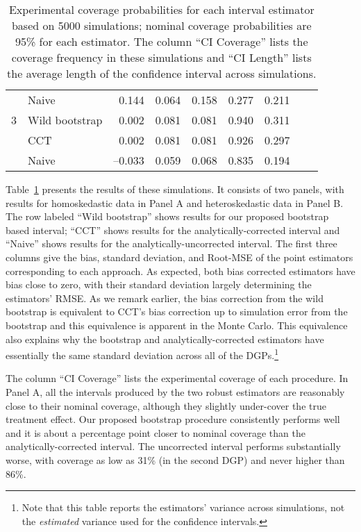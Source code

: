\documentclass[12pt,fleqn]{article}
\begin{document}
\begin{table}[t]
\begin{tabular}{rlrrrrrrr}
      & Naive          & 0.144 & 0.064 & 0.158 & 0.277 & 0.211 \\
    3 & Wild bootstrap & 0.002 & 0.081 & 0.081 & 0.940 & 0.311 \\
      & CCT            & 0.002 & 0.081 & 0.081 & 0.926 & 0.297 \\
      & Naive          & --0.033 & 0.059 & 0.068 & 0.835 & 0.194 \\
    \bottomrule
  \end{tabular}
  \caption{%
    Experimental coverage probabilities for each interval estimator based on 5000
    simulations; nominal coverage probabilities are 95\% for each estimator. The column
    ``CI Coverage'' lists the coverage frequency in these simulations and ``CI Length''
    lists the average length of the confidence interval across simulations.}
  \label{tbl:1}
\end{table}

Table~\ref{tbl:1} presents the results of these simulations. It consists of two panels, with results for homoskedastic data in Panel A and heteroskedastic data in Panel B. The row labeled
``Wild bootstrap'' shows results for our proposed bootstrap based interval; ``CCT'' shows
results for the analytically-corrected interval and ``Naive'' shows results for
the analytically-uncorrected interval. The first three columns give the bias,
standard deviation, and Root-MSE of the point
estimators corresponding to each approach.  As expected, both
bias corrected estimators have
bias close to zero, with their standard deviation largely
determining the estimators' RMSE.
As we remark earlier, the bias correction from the wild bootstrap is equivalent
to CCT's bias correction up to simulation error from the bootstrap and this
equivalence is apparent in the Monte Carlo. This equivalence also explains why
the bootstrap and analytically-corrected estimators have essentially the same
standard deviation across all of the DGPs.\footnote{%
  Note that this table reports the estimators' variance across simulations,
  not the \emph{estimated} variance used for the confidence intervals.} %

The column ``CI Coverage'' lists the experimental coverage of each procedure.  In 
Panel A, all the intervals produced by the two robust estimators are reasonably close to 
their nominal coverage, although they slightly under-cover the true treatment effect.
Our proposed bootstrap procedure consistently performs well and it is about a percentage point 
closer to nominal coverage than the analytically-corrected interval. The uncorrected interval performs substantially worse, with coverage as low as 31\% (in the second DGP) and never
higher than 86\%. 
\end{document}
